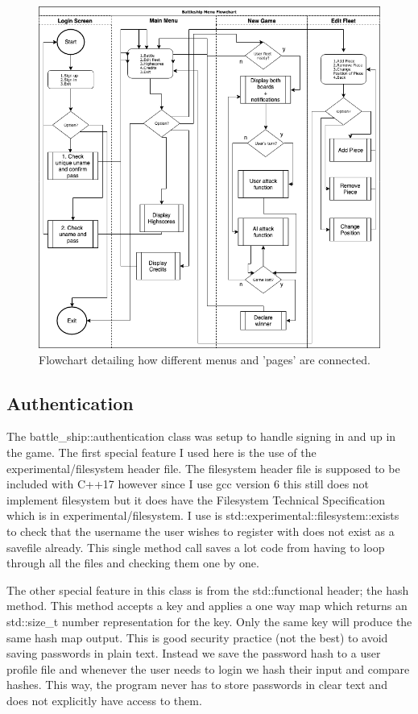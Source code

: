\documentclass[11pt]{article} %
\begin{document}
\begin{figure}
\centering
\includegraphics[scale=0.75]{images/menu.png}
\caption{Flowchart detailing how different menus and 'pages' are connected.}
\label{fig:all_menus}
\end{figure}
\clearpage
\subsection{Authentication}
The battle\_ship::authentication class was setup to handle signing in and up in the game.
The first special feature I used here is the use of the experimental/filesystem header file.
The filesystem header file is supposed to be included with C++17 however since I use gcc version 6
this still does not implement filesystem but it does have the Filesystem Technical Specification which is in
 experimental/filesystem. I use is std::experimental::filesystem::exists to check that the username
the user wishes to register with does not exist as a savefile already.
This single method call saves a lot code from having to loop through all the files
and checking them one by one.
\\
\par The other special feature in this class is from the std::functional header; the hash method.
This method accepts a key and applies a one way map which returns an std::size\_t number
representation for the key.
Only the same key will produce the same hash map output.
This is good security practice (not the best) to avoid saving passwords in plain text.
Instead we save the password hash to a user profile file and whenever the user needs to login we hash their input and compare hashes.
This way, the program never has to store passwords in clear text and does not explicitly have access to them.
\end{document}
